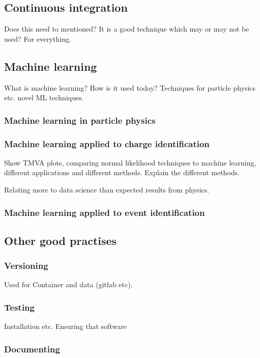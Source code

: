 \subsection{Continuous integration}
Does this need to mentioned? It is a good technique which may or may not be used? For everything.

\subsection{Machine learning}

What is machine learning? How is it used today? Techniques for particle physics etc. novel ML techniques.

\subsubsection{Machine learning in particle physics}

\subsubsection{Machine learning applied to charge identification}

Show TMVA plots, comparing normal likelihood techniques to machine learning, different applications and different methods. Explain the different methods.

Relating more to data science than expected results from physics.

\subsubsection{Machine learning applied to event identification}


\subsection{Other good practises}

\subsubsection{Versioning}
Used for Container and data (gitlab etc). 


\subsubsection{Testing}
Installation etc. Ensuring that software 

\subsubsection{Documenting}



